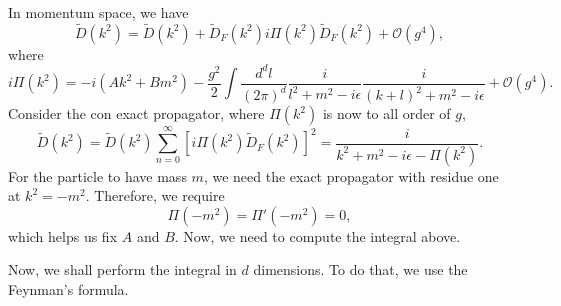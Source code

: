 \begin{center}
\end{center}

In momentum space, we have
\begin{equation}
    \tilde{D}(k^2) = \tilde{D}(k^2) + \tilde{D}_F(k^2)i\Pi(k^2)\tilde{D}_F(k^2) + \mathcal{O}(g^4) ,
\end{equation}
where
\begin{equation}
    i\Pi(k^2) =-i(Ak^2+Bm^2) - \frac{g^2}{2}\int \frac{d^dl}{(2\pi)^d} \frac{i}{l^2+m^2-i\epsilon}\frac{i}{(k+l)^2+m^2-i\epsilon} + \mathcal{O}(g^4).
\end{equation}
Consider the con exact propagator, where $\Pi(k^2)$ is now to all order of $g$,
\begin{equation}
    \tilde{D}(k^2) = \tilde{D}(k^2)\sum_{n=0}^\infty[i\Pi(k^2)\tilde{D}_F(k^2)]^2 = \frac{i}{k^2+m^2-i\epsilon -\Pi(k^2)}.
\end{equation}
For the particle to have mass $m$, we need the exact propagator with residue one at $k^2=-m^2$. Therefore, we require
\begin{equation}
    \Pi(-m^2) = \Pi'(-m^2) = 0,
\end{equation}
which helps us fix $A$ and $B$. Now, we need to compute the integral above. 

Now, we shall perform the integral in $d$ dimensions. To do that, we use the Feynman's formula.

